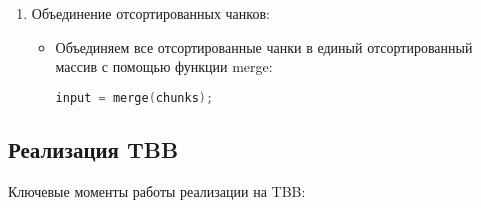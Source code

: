 \documentclass[]{article}
\theoremstyle{remark}
\theoremstyle{definition}
\newcommand{\cpp}{\textit{}}
\begin{document}
\begin{enumerate}
    \item Объединение отсортированных чанков:
    \begin{itemize}
        \item Объединяем все отсортированные чанки в единый отсортированный массив с помощью функции \cpp{merge}:
        \begin{lstlisting}[language=C++]
    input = merge(chunks);
        \end{lstlisting}
    \end{itemize}
\end{enumerate}


\subsection{Реализация TBB}

\par Ключевые моменты работы реализации на TBB:
\end{document}
